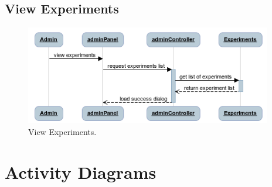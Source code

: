 \documentclass[a4paper,12pt,oneside]{report}
\begin{document}
\newpage

\vskip 1cm
\subsection{View Experiments}
\vskip 1cm
\begin{figure}[!hp]
  \begin{center}
   \includegraphics[width=10.8cm]{pics/view_experiments.png}
  \end{center}
\caption{View Experiments.}
\end{figure}


\newpage

\section{Activity Diagrams}
\end{document}
